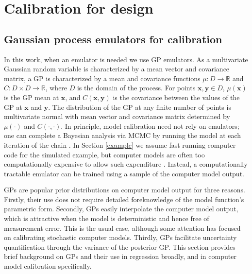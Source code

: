 \documentclass[12pt]{article}
\begin{document}
%
\section{Calibration for design}\label{calib_for_design}

%
\subsection{Gaussian process emulators for calibration}
%
In this work, when an emulator is needed we use GP emulators.
%
As a multivariate Gaussian random variable is characterized by a mean vector and covariance matrix, a GP is characterized by a mean and covariance functions $\mu:D\to \mathbb R$ and $C:D\times D\to \mathbb R$, where $D$ is the domain of the process. 
%
For points $\mathbf x,\mathbf y\in D$, $\mu(\mathbf x)$ is the GP mean at $\mathbf x$, and $C(\mathbf x, \mathbf y)$ is the covariance between the values of the GP at $\mathbf x$ and $\mathbf y$.
%
The distribution of the GP at any finite number of points is multivariate normal with mean vector and covariance matrix determined by $\mu(\cdot)$ and $C(\cdot,\cdot)$.
%
In principle, model calibration need not rely on emulators; one can complete a Bayesian analysis via MCMC by running the model at each iteration of the chain \citep[see e.g.][]{Hemez2011}. 
%
In Section \ref{example} we assume fast-running computer code for the simulated example, but
%
computer models are often too computationally expensive to allow such expenditure \citep{VanBuren2013,VanBuren2014}.
%
Instead, a computationally tractable emulator can be trained using a sample of the computer model output. 
%

%
GPs are popular prior distributions on computer model output for three reasons.
%
Firstly, their use does not require detailed foreknowledge of the model function's parametric form. 
%
Secondly, GPs easily interpolate the computer model output, which is attractive when the model is deterministic and hence free of measurement error. 
%
This is the usual case, although some attention \citep[e.g.,][]{Pratola2018} has focused on calibrating stochastic computer models. 
%
Thirdly, GPs facilitate uncertainty quantification through the variance of the posterior GP. 
%
This section provides brief background on GPs and their use in regression broadly, and in computer model calibration specifically.
%
\end{document}
